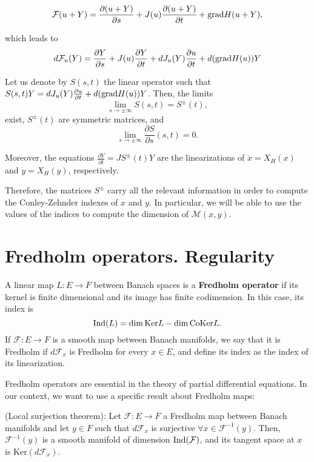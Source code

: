 \[\mathcal{F}(u+Y) = \frac{\partial (u + Y)}{\partial s} + J(u) \frac{\partial (u + Y)}{\partial t}  + \mathrm{grad} H(u + Y) ,\]

which leads to
\[d\mathcal{F}_u(Y) = \frac{\partial Y}{\partial s} + J(u) \frac{\partial Y}{\partial t} + dJ_u(Y) \frac{\partial u}{\partial t} + d(\mathrm{grad} H(u)) Y\]

\begin{prop}
Let us denote by $S(s,t)$ the linear operator such that $S(s,t)Y = dJ_u(Y) \frac{\partial u}{\partial t} + d(\mathrm{grad} H(u))Y$. Then, the limits
\[\lim_{s \rightarrow \pm \infty} S(s,t) = S^{\pm}(t) ,\]
exist, $S^{\pm}(t)$ are symmetric matrices, and
\[\lim_{s \rightarrow \pm \infty} \frac{\partial S}{\partial s} (s,t) = 0 .\]

Moreover, the equations $\frac{\partial Y}{\partial t} = J S^{\pm}(t)Y$ are the linearizations of $\dot{x} = X_H(x)$ and $\dot{y} = X_H(y)$, respectively.
\end{prop}

Therefore, the matrices $S^{\pm}$ carry all the relevant information in order to compute the Conley-Zehnder indexes of $x$ and $y$. In particular, we will be able to use the values of the indices to compute the dimension of $\mathcal{M}(x,y)$.

\section{Fredholm operators. Regularity}

\begin{deff}
A linear map $L : E \rightarrow F$ between Banach spaces is a {\bf Fredholm operator} if its kernel is finite dimensional and its image has finite codimension. In this case, its index is
\[\mathrm{Ind}(L) = \dim \mathrm{Ker} L - \dim \mathrm{CoKer} L .\]
If $\mathcal{F} : E \rightarrow F$ is a smooth map between Banach manifolds, we say that it is Fredholm if $d\mathcal{F}_x$ is Fredholm for every $x \in E$, and define its index as the index of its linearization.
\end{deff}

Fredholm operators are essential in the theory of partial differential equations. In our context, we want to use a specific result about Fredholm maps:

\begin{theo} \label{theo:local_surjection} (Local surjection theorem): Let $\mathcal{F} : E \rightarrow F$ a Fredholm map between Banach manifolds and let $y \in F$ such that $d\mathcal{F}_x$ is surjective $\forall x \in \mathcal{F}^{-1}(y)$. Then, $\mathcal{F}^{-1}(y)$ is a smooth manifold of dimension $\mathrm{Ind}(\mathcal{F})$, and its tangent space at $x$ is $\mathrm{Ker}(d\mathcal{F}_x)$.
\end{theo}

